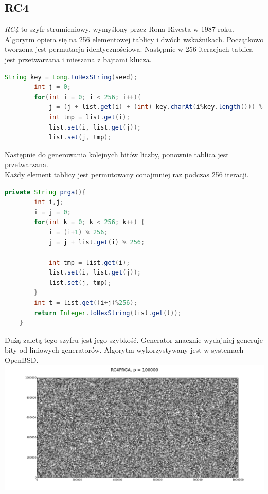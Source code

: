 \documentclass[a4paper, 11pt]{article} %
\begin{document}
\subsection{RC4}
\textit{RC4} to szyfr strumieniowy, wymyślony przez Rona Rivesta w 1987 roku. Algorytm opiera się na 256 elementowej tablicy i dwóch wskaźnikach. Początkowo tworzona jest permutacja identycznościowa. Następnie w 256 iteracjach tablica jest przetwarzana i mieszana z bajtami klucza.
\begin{lstlisting}[style=mystyle, language=java, frame=single, caption = Inicjalizowanie RC4.]
        String key = Long.toHexString(seed);
        int j = 0;
        for(int i = 0; i < 256; i++){
            j = (j + list.get(i) + (int) key.charAt(i%key.length())) % 256;
            int tmp = list.get(i);
            list.set(i, list.get(j));
            list.set(j, tmp);
\end{lstlisting}
Następnie do generowania kolejnych bitów liczby, ponownie tablica jest przetwarzana.\\ Każdy element tablicy jest permutowany conajmniej raz podczas 256 iteracji.
\begin{lstlisting}[style=mystyle, language=java, frame=single, caption = Generowanie losowego bajtu liczby za pomocą RC4.]
    private String prga(){
        int i,j;
        i = j = 0;
        for(int k = 0; k < 256; k++) {
        	i = (i+1) % 256;
        	j = j + list.get(i) % 256;

        	int tmp = list.get(i);
        	list.set(i, list.get(j));
        	list.set(j, tmp);
        }
        int t = list.get((i+j)%256);
        return Integer.toHexString(list.get(t));
    }
\end{lstlisting}
Dużą zaletą tego szyfru jest jego szybkość. Generator znacznie wydajniej generuje bity od liniowych generatorów. Algorytm wykorzystywany jest w systemach OpenBSD.\\
\includegraphics[width=\linewidth]{img/rc4-1.png}
\end{document}
